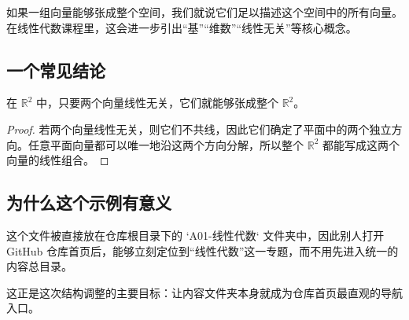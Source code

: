 如果一组向量能够张成整个空间，我们就说它们足以描述这个空间中的所有向量。在线性代数课程里，这会进一步引出“基”“维数”“线性无关”等核心概念。

\subsection{一个常见结论}

\begin{theorem}
在 $\mathbb{R}^2$ 中，只要两个向量线性无关，它们就能够张成整个 $\mathbb{R}^2$。
\end{theorem}

\begin{proof}
若两个向量线性无关，则它们不共线，因此它们确定了平面中的两个独立方向。任意平面向量都可以唯一地沿这两个方向分解，所以整个 $\mathbb{R}^2$ 都能写成这两个向量的线性组合。
\end{proof}

\subsection{为什么这个示例有意义}

\begin{example}
这个文件被直接放在仓库根目录下的 `A01-线性代数` 文件夹中，因此别人打开 GitHub 仓库首页后，能够立刻定位到“线性代数”这一专题，而不用先进入统一的内容总目录。
\end{example}

这正是这次结构调整的主要目标：让内容文件夹本身就成为仓库首页最直观的导航入口。
